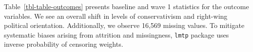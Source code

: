 \documentclass[
  singlecolumn]{article}
\begin{document}
Table~\ref{tbl-table-outcomes} presents baseline and wave 1 statistics
for the outcome variables. We see an overall shift in levels of
conservativism and right-wing political orientation. Additionally, we
observe 16,569 missing values. To mitigate systematic biases arising
from attrition and missingness, \texttt{lmtp} package uses inverse
probability of censoring weights.
\end{document}
